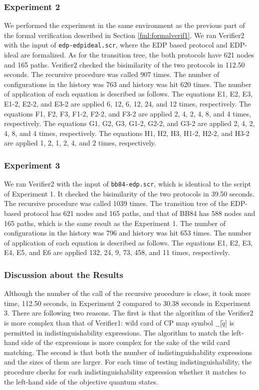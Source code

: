 \subsubsection{Experiment 2}
We performed the experiment in the same environment as the
previous part of the formal verification described
in Section \ref{fml:formalverif1}.
We ran Verifier2 with the input of {\tt edp-edpideal.scr}, where
the EDP based protocol and EDP-ideal are formalized.
As for the transition tree, the both protocols have 621 nodes and 165
paths. Verifier2 checked the bisimilarity of the two protocols in 112.50
seconds. The recursive procedure was called 907 times.
The number of configurations in the history was 763 and
history was hit 620 times. The number of application of each equation
is described as follows. The equations E1, E2, E3, E1-2, E2-2, and E3-2 are
applied 6, 12, 6, 12, 24, and 12 times, respectively.
The equations F1, F2, F3, F1-2, F2-2, and F3-2 are
applied 2, 4, 2, 4, 8, and 4 times, respectively.
The equations G1, G2, G3, G1-2, G2-2, and G3-2 are
applied 2, 4, 2, 4, 8, and 4 times, respectively.
The equations H1, H2, H3, H1-2, H2-2, and H3-2 are
applied 1, 2, 1, 2, 4, and 2 times, respectively.

\subsubsection{Experiment 3}
We ran Verifier2 with the input of {\tt bb84-edp.scr}, which is
identical to the script of Experiment 1.
It checked the bisimilarity of the two protocols in 39.50
seconds. The recursive procedure was called 1039 times. 
The transition tree of the EDP-based protocol has 621 nodes and 165
paths, and that of BB84 has 588 nodes and 165 paths, which is the same
result as the Experiment 1.
The number of configurations in the history was 796 and
history was hit 653 times. The number of application of each equation
is described as follows. The equations E1, E2, E3, E4, E5, and E6 are
applied 132, 24, 9, 73, 458, and 11 times, respectively.

\subsubsection{Discussion about the Results}
Although the number of the call of the recursive procedure is close,
it took more time, 112.50 seconds, in Experiment 2
compared to 30.38 seconds in Experiment 3.
There are following two reasons.
The first is that the algorithm of the Verifier2 
is more complex than that of Verifier1: 
wild card of CP map symbol $\texttt{\_\_[} \tilde q \texttt{]}$ 
is permitted in indistinguishability expressions. The algorithm
to match the left-hand side of the expressions is more complex for the
sake of the wild card matching.
The second is that both the number of indistinguishability expressions
and the sizes of them are larger. For each time of testing
indistinguishability, the procedure checks for each 
indistinguishability expression whether it matches to the
left-hand side of the objective quantum states.

